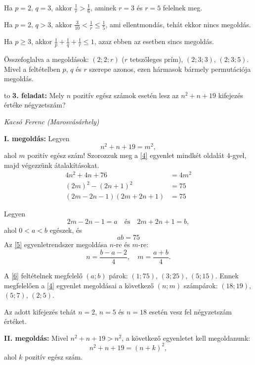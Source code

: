 \documentclass[a4paper,10pt]{article}
\newcommand{\ki}[2]{\hfill {\it #1 (#2)}\medskip}
\newcommand{\vonal}{\hbox to \hsize{\hskip2truecm\hrulefill\hskip2truecm}}
\begin{document}
Ha $p=2$, $q=3$, akkor $\frac{1}{r}>\frac16$, aminek $r=3$ és $r=5$ felelnek meg.

Ha $p=2$, $q>3$, akkor $\frac{3}{10}<\frac1r\le\frac15$, ami ellentmondás, tehát ekkor nincs megoldás.

Ha $p\ge 3$, akkor $\frac1p+\frac1q+\frac1r\le1$, azaz ebben az esetben sincs megoldás.

Összefoglalva a megoldások: $(2;2;r)$ ($r$ tetszőleges prím), $(2;3;3)$, $(2;3;5)$. Mivel a feltételben $p$, $q$ és $r$ szerepe azonos, ezen hármasok bármely permutációja megoldás.

\medskip

\vonal
{\bf 3. feladat: } Mely $n$ pozitív egész számok esetén lesz az $n^2+n+19$ kifejezés értéke négyzetszám?

\ki{Kacsó Ferenc}{Marosvásárhely}\medskip

{\bf I. megoldás: } Legyen
\begin{equation}
n^2+n+19=m^2,\label{4}
\end{equation}
ahol $m$ pozitív egész szám! Szorozzuk meg a \eqref{4} egyenlet mindkét oldalát 4-gyel, majd végezzünk átalakításokat.
\begin{align*}
4n^2+4n+76&=4m^2\\
(2m)^2-(2n+1)^2&=75\\
(2m-2n-1)(2m+2n+1)&=75
\end{align*}

Legyen
\begin{equation}
2m-2n-1=a\quad\text{és}\quad 2m+2n+1=b,\label{5}
\end{equation}
ahol $0<a<b$ egészek, és
\begin{equation}
ab=75\label{6}
\end{equation}
Az \eqref{5} egyenletrendszer megoldása $n$-re és $m$-re:
\[n=\frac{b-a-2}{4},\quad m=\frac{a+b}{4}.\]

A \eqref{6} feltételnek megfelelő $(a;b)$ párok: $(1;75)$, $(3;25)$, $(5;15)$. Ennek megfelelően a \eqref{4} egyenlet megoldásai a következő $(n;m)$ számpárok: $(18;19)$, $(5;7)$, $(2;5)$.

Az adott kifejezés tehát $n=2$, $n=5$ és $n=18$ esetén vesz fel négyzetszám értéket.

\medskip

{\bf II. megoldás: } Mivel $n^2+n+19>n^2$, a következő egyenletet kell megoldanunk:
\begin{equation}
n^2+n+19=(n+k)^2,\label{7}
\end{equation}
ahol $k$ pozitív egész szám.
\end{document}
